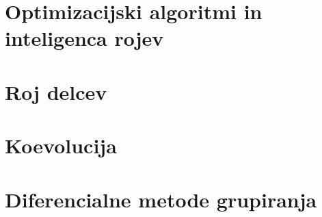 \section{Optimizacijski algoritmi in inteligenca rojev}


\section{Roj delcev}


\section{Koevolucija}


\section{Diferencialne metode grupiranja}


